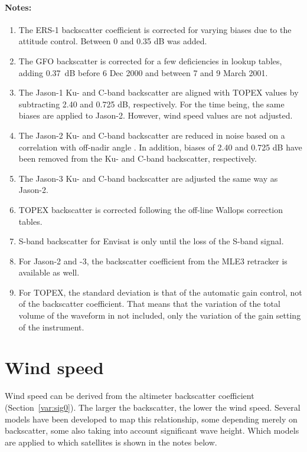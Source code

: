 \documentclass[a4paper,11pt,openany,natbib,nomargin]{thesis}
\newenvironment{notes}[1][Notes:]{\FloatBarrier\paragraph{#1}\begin{enumerate}}{\end{enumerate}}
\begin{document}
\begin{notes}
\item The ERS-1 backscatter coefficient is corrected for varying biases due to the attitude control. Between 0 and 0.35 dB was added.\label{item:sig0_e1}
\item The GFO backscatter is corrected for a few deficiencies in lookup tables, adding 0.37~dB before 6 Dec 2000 and between 7 and 9 March 2001.\label{item:sig0_g1}
\item The Jason-1 Ku- and C-band backscatter are aligned with TOPEX values by subtracting 2.40 and 0.725 dB, respectively. For the time being, the same biases are applied to Jason-2. However, wind speed values are not adjusted.\label{item:sig0_j1}
\item The Jason-2 Ku- and C-band backscatter are reduced in noise based on a correlation with off-nadir angle \citep{quartly2009a}. In addition, biases of 2.40 and 0.725 dB have been removed from the Ku- and C-band backscatter, respectively.\label{item:sig0_j2}
\item The Jason-3 Ku- and C-band backscatter are adjusted the same way as Jason-2.\label{item:sig0_j3}
\item TOPEX backscatter is corrected following the off-line Wallops correction tables.\label{item:sig0_tx}
\item S-band backscatter for Envisat is only until the loss of the S-band signal.\label{item:sig0_n1}
\item For Jason-2 and -3, the backscatter coefficient from the MLE3 retracker is available as well.\label{item:sig0_ku_mle3}
\item For TOPEX, the standard deviation is that of the automatic gain control, not of the backscatter coefficient. That means that the variation of the total volume of the waveform in not included, only the variation of the gain setting of the instrument.\label{item:sig0_rms_tx}
\end{notes}

\section{Wind speed}
\label{var:wind}
Wind speed can be derived from the altimeter backscatter coefficient (Section~\ref{var:sig0}). The larger the backscatter, the lower the wind speed. Several models have been developed to map this relationship, some depending merely on backscatter, some also taking into account significant wave height. Which models are applied to which satellites is shown in the notes below.
\end{document}
